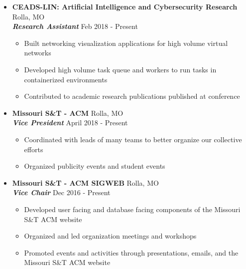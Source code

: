 \documentclass[9pt,oneside]{memoir}
\begin{document}
\begin{itemize}
    \item[] \textbf{CEADS-LIN: Artificial Intelligence and Cybersecurity Research}
		\hfill Rolla, MO\\
		\textit{\textbf{Research Assistant}}
		\hfill Feb 2018 - Present
		\begin{itemize}
		    \item[\textbullet] Built networking visualization applications for high volume virtual networks
		    \item[\textbullet] Developed high volume task queue and workers to run tasks in containerized environments
			\item[\textbullet] Contributed to academic research publications published at conference
		\end{itemize}
		
	\item[] \textbf{Missouri S\&T - ACM}
	    \hfill Rolla, MO\\
	    \textit{\textbf{Vice President}}
	    \hfill April 2018 - Present
	    \begin{itemize}
	        \item[\textbullet] Coordinated with leads of many teams to better organize our collective efforts
	         \item[\textbullet] Organized publicity events and student events
	    \end{itemize}
		
	\item[] \textbf{Missouri S\&T - ACM SIGWEB}
		\hfill Rolla, MO\\
		\textit{\textbf{Vice Chair}}
		\hfill Dec 2016 - Present
		\begin{itemize}
			\item[\textbullet] Developed user facing and database facing components of the Missouri S\&T ACM website
			\item[\textbullet] Organized and led organization meetings and workshops
			\item[\textbullet] Promoted events and activities through presentations, emails, and the Missouri S\&T ACM website
		\end{itemize}
\end{itemize}


\vspace*{-10pt}
\end{document}
